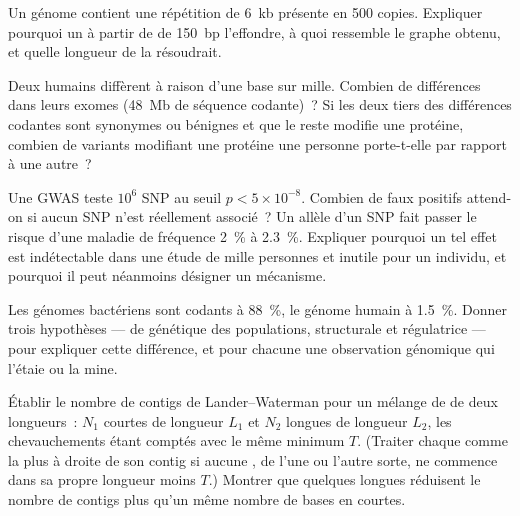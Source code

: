 \begin{exercise}[$\star\star$]\label{exo:b3:genomics:7}
Un génome contient une répétition de \qty{6}{kb} présente en \num{500}
copies. Expliquer pourquoi un  à partir de  de
\qty{150}{bp} l'effondre, à quoi ressemble le graphe obtenu, et quelle
longueur de  la résoudrait.
\end{exercise}

\begin{exercise}[$\star\star$]\label{exo:b3:genomics:8}
Deux humains diffèrent à raison d'une base sur mille. Combien de
différences dans leurs exomes (\qty{48}{Mb} de séquence codante)~? Si
les deux tiers des différences codantes sont synonymes ou bénignes et
que le reste modifie une protéine, combien de variants modifiant une
protéine une personne porte-t-elle par rapport à une autre~?
\end{exercise}

\begin{exercise}[$\star\star$]\label{exo:b3:genomics:9}
Une GWAS teste $10^{6}$ SNP au seuil $p < 5\times 10^{-8}$. Combien de
faux positifs attend-on si aucun SNP n'est réellement associé~? Un
allèle d'un SNP fait passer le risque d'une maladie de fréquence
\qty{2}{\%} à \qty{2.3}{\%}. Expliquer pourquoi un tel effet est
indétectable dans une étude de mille personnes et inutile pour un
individu, et pourquoi il peut néanmoins désigner un mécanisme.
\end{exercise}

\begin{exercise}[$\star\star\star$]\label{exo:b3:genomics:10}
Les génomes bactériens sont codants à \qty{88}{\%}, le génome humain à
\qty{1.5}{\%}. Donner trois hypothèses --- de génétique des populations,
structurale et régulatrice --- pour expliquer cette différence, et pour
chacune une observation génomique qui l'étaie ou la mine.
\end{exercise}

\begin{exercise}[$\star\star\star$]\label{exo:b3:genomics:11}
Établir le nombre de contigs de Lander--Waterman pour un mélange de
 de deux longueurs~: $N_{1}$  courtes de longueur
$L_{1}$ et $N_{2}$  longues de longueur $L_{2}$, les
chevauchements étant comptés avec le même minimum $T$. (Traiter chaque
 comme la plus à droite de son contig si aucune , de l'une
ou l'autre sorte, ne commence dans sa propre longueur moins $T$.)
Montrer que quelques longues  réduisent le nombre de contigs
plus qu'un même nombre de bases en  courtes.
\end{exercise}


